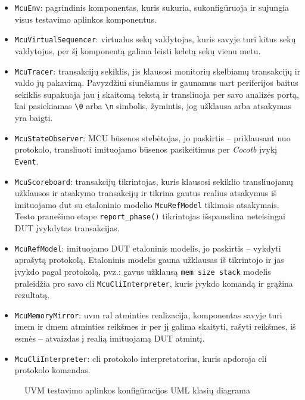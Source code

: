 \begin{itemize}
	\item \texttt{McuEnv}: pagrindinis komponentas, kuris sukuria, sukonfigūruoja ir sujungia visus testavimo aplinkos komponentus.
	\item \texttt{McuVirtualSequencer}: virtualus sekų valdytojas, kuris savyje turi kitus sekų valdytojus, per šį komponentą galima leisti keletą sekų vienu metu.
	\item \texttt{McuTracer}: transakcijų sekiklis, jis klausosi monitorių skelbiamų transakcijų ir valdo jų pakavimą. Pavyzdžiui siunčiamus ir gaunamus \gls{uart} periferijos baitus sekiklis supakuoja jau į skaitomą tekstą ir transliuoja per savo analizės portą, kai pasiekiamas \texttt{\textbackslash 0} arba \texttt{\textbackslash n} simbolis, žymintis, jog užklausa arba atsakymas yra baigti.
	\item \texttt{McuStateObserver}: MCU būsenos stebėtojas, jo paskirtis -- priklausant nuo protokolo, transliuoti imituojamo  būsenos pasikeitimus per \textit{Cocotb} įvykį \texttt{Event}.
	\item \texttt{McuScoreboard}: transakcijų tikrintojas, kuris klausosi sekiklio transliuojamų užklausos ir atsakymo transakcijų ir tikrina gautus realius atsakymus iš imituojamo \gls{dut} su etaloninio modelio \texttt{McuRefModel} tikimais atsakymais. Testo pranešimo etape \texttt{report\_phase()} tikrintojas išspausdina neteisingai DUT įvykdytas transakcijas.
	\item \texttt{McuRefModel}: imituojamo DUT etaloninis modelis, jo paskirtis -- vykdyti aprašytą protokolą. Etaloninis modelis gauna užklausas iš tikrintojo ir jas įvykdo pagal protokolą, pvz.: gavus užklausą \texttt{mem size stack} modelis praleidžia pro savo \gls{cli} \texttt{McuCliInterpreter}, kuris įvykdo komandą ir grąžina rezultatą.
	\item \texttt{McuMemoryMirror}: \gls{uvm} \gls{ral} atminties realizacija, komponentas savyje turi \gls{imem} ir \gls{dmem} atminties reikšmes ir per jį galima skaityti, rašyti reikšmes, iš esmės -- atvaizdas į realią imituojamą DUT atmintį.
	\item \texttt{McuCliInterpreter}: \gls{cli} protokolo interpretatorius, kuris apdoroja \gls{cli} protokolo komandas.
\end{itemize}

\begin{figure}[H]
	
	\caption{UVM testavimo aplinkos konfigūracijos UML klasių diagrama}
	\label{fig:uml_class_tb_cfg}
\end{figure}

